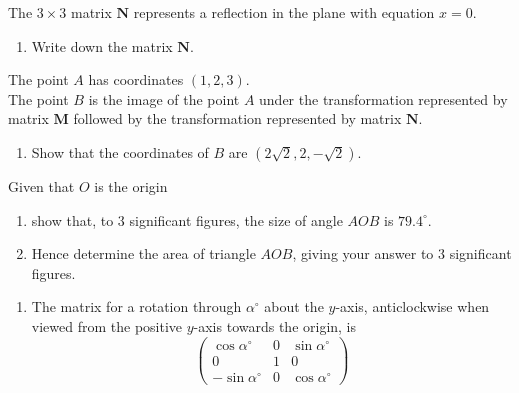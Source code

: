 \documentclass[leqno]{article}
\begin{document}
\begin{enumerate}[
  label=\textbf{\arabic*.},
  leftmargin=*,
  topsep=0pt,
  partopsep=0pt,
  parsep=0pt
]
The $3\times 3$ matrix $\mathbf{N}$ represents a reflection in the plane with equation $x = 0$. \\

\begin{enumerate}[label=\textbf{(\alph*)}, resume]
  \item Write down the matrix $\mathbf{N}$.  \\
\end{enumerate}

The point $A$ has coordinates $(1, 2, 3)$. \\

The point $B$ is the image of the point $A$ under the transformation represented by matrix $\mathbf{M}$ followed by the transformation represented by matrix $\mathbf{N}$. \\

\begin{enumerate}[label=\textbf{(\alph*)}, resume]
  \item Show that the coordinates of $B$ are $(2\sqrt{2}, 2, -\sqrt{2})$.  \\
\end{enumerate}

Given that $O$ is the origin \\

\begin{enumerate}[label=\textbf{(\alph*)}, resume]
  \item show that, to $3$ significant figures, the size of angle $AOB$ is $79.4^\circ$.  \\
  \item Hence determine the area of triangle $AOB$, giving your answer to $3$ significant figures.  \\
\end{enumerate}

\vspace*{10pt}

\begin{djsSolution}
\begin{enumerate}[label=\textbf{(\alph*)}]
\item The matrix for a rotation through \(\alpha^\circ\) about the \(y\)-axis, anticlockwise when viewed from the positive \(y\)-axis towards the origin, is
\[
\begin{pmatrix}
\cos\alpha^\circ & 0 & \sin\alpha^\circ\\
0&1&0\\
-\sin\alpha^\circ&0&\cos\alpha^\circ
\end{pmatrix}
\]


\end{enumerate}
\end{djsSolution}
\end{enumerate}
\end{document}
